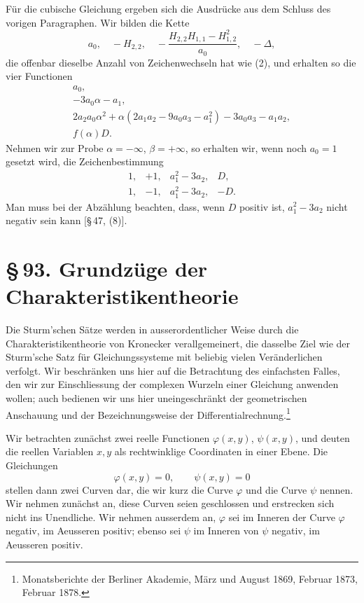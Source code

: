\documentclass[11pt]{article}
\providecommand{\sect}[2]{\section*{\S\,#1. #2}}
\begin{document}
Für die cubische Gleichung ergeben sich die Ausdrücke aus dem Schluss des vorigen Paragraphen. Wir bilden die Kette
\[
        a_0,
        \quad -H_{2,2},
        \quad -\frac{H_{2,2}H_{1,1}-H_{1,2}^2}{a_0},
        \quad -\Delta,
\]
die offenbar dieselbe Anzahl von Zeichenwechseln hat wie (2), und erhalten so die vier Functionen
\[
\begin{array}{l}
 a_0,\\[0.2em]
 -3a_0\alpha-a_1,\\[0.2em]
 2a_2a_0\alpha^2+\alpha(2a_1a_2-9a_0a_3-a_1^2)-3a_0a_3-a_1a_2,\\[0.2em]
 f(\alpha)D.
\end{array}
\]
Nehmen wir zur Probe $\alpha=-\infty$, $\beta=+\infty$, so erhalten wir, wenn noch $a_0=1$ gesetzt wird, die Zeichenbestimmung
\[
\begin{array}{llll}
1,&+1,&a_1^2-3a_2,&D,\\
1,&-1,&a_1^2-3a_2,&-D.
\end{array}
\]
Man muss bei der Abzählung beachten, dass, wenn $D$ positiv ist, $a_1^2-3a_2$ nicht negativ sein kann [\S\,47, (8)].

\sect{93}{Grundzüge der Charakteristikentheorie}

Die Sturm'schen Sätze werden in ausserordentlicher Weise durch die Charakteristikentheorie von Kronecker verallgemeinert, die dasselbe Ziel wie der Sturm'sche Satz für Gleichungssysteme mit beliebig vielen Veränderlichen verfolgt. Wir beschränken uns hier auf die Betrachtung des einfachsten Falles, den wir zur Einschliessung der complexen Wurzeln einer Gleichung anwenden wollen; auch bedienen wir uns hier uneingeschränkt der geometrischen Anschauung und der Bezeichnungsweise der Differentialrechnung.\footnote{Monatsberichte der Berliner Akademie, März und August 1869, Februar 1873, Februar 1878.}

Wir betrachten zunächst zwei reelle Functionen $\varphi(x,y)$, $\psi(x,y)$, und deuten die reellen Variablen $x,y$ als rechtwinklige Coordinaten in einer Ebene. Die Gleichungen
\begin{equation}
        \varphi(x,y)=0,\qquad \psi(x,y)=0
\tag{1}
\end{equation}
stellen dann zwei Curven dar, die wir kurz die Curve $\varphi$ und die Curve $\psi$ nennen. Wir nehmen zunächst an, diese Curven seien geschlossen und erstrecken sich nicht ins Unendliche. Wir nehmen ausserdem an, $\varphi$ sei im Inneren der Curve $\varphi$ negativ, im Aeusseren positiv; ebenso sei $\psi$ im Inneren von $\psi$ negativ, im Aeusseren positiv.
\end{document}

